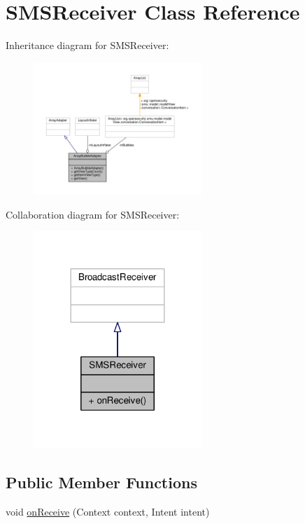 \hypertarget{a00016}{\section{S\+M\+S\+Receiver Class Reference}
\label{a00016}
}


Inheritance diagram for S\+M\+S\+Receiver\+:
\nopagebreak
\begin{figure}[H]
\begin{center}
\leavevmode
\includegraphics[width=180pt]{a00053}
\end{center}
\end{figure}


Collaboration diagram for S\+M\+S\+Receiver\+:
\nopagebreak
\begin{figure}[H]
\begin{center}
\leavevmode
\includegraphics[width=180pt]{a00054}
\end{center}
\end{figure}
\subsection*{Public Member Functions}
\begin{DoxyCompactItemize}
\item 
void \hyperlink{a00016_afe2ab6137f59f9ff640f1e3b74080ad7}{on\+Receive} (Context context, Intent intent)
\end{DoxyCompactItemize}


